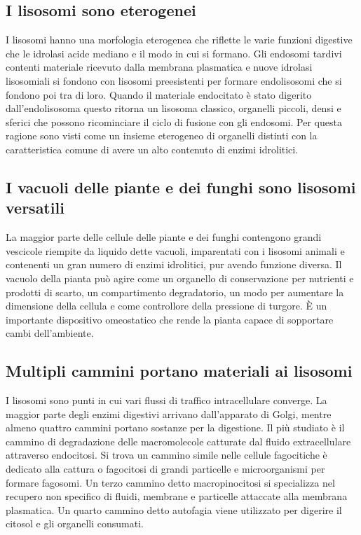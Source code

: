 \subsection{I lisosomi sono eterogenei}
I lisosomi hanno una morfologia eterogenea che riflette le varie funzioni digestive che le idrolasi acide mediano e il modo in cui si formano. Gli endosomi tardivi contenti materiale
ricevuto dalla membrana plasmatica e nuove idrolasi lisosomiali si fondono con lisosomi preesistenti per formare endolisosomi che si fondono poi tra di loro. Quando il materiale 
endocitato \`e stato digerito dall'endolisosoma questo ritorna un lisosoma classico, organelli piccoli, densi e sferici che possono ricominciare il ciclo di fusione con gli endosomi.
Per questa ragione sono visti come un insieme eterogeneo di organelli distinti con la caratteristica comune di avere un alto contenuto di enzimi idrolitici.
\subsection{I vacuoli delle piante e dei funghi sono lisosomi versatili}
La maggior parte delle cellule delle piante e dei funghi contengono grandi vescicole riempite da liquido dette vacuoli, imparentati con i lisosomi animali e contenenti un gran numero di
enzimi idrolitici, pur avendo funzione diversa. Il vacuolo della pianta pu\`o agire come un organello di conservazione per nutrienti e prodotti di scarto, un compartimento degradatorio,
un modo per aumentare la dimensione della cellula e come controllore della pressione di turgore. \`E un importante dispositivo omeostatico che rende la pianta capace di sopportare 
cambi dell'ambiente.
\subsection{Multipli cammini portano materiali ai lisosomi}
I lisosomi sono punti in cui vari flussi di traffico intracellulare converge. La maggior parte degli enzimi digestivi arrivano dall'apparato di Golgi, mentre almeno quattro cammini 
portano sostanze per la digestione. Il pi\`u studiato \`e il cammino di degradazione delle macromolecole catturate dal fluido extracellulare attraverso endocitosi. Si trova un
cammino simile nelle cellule fagocitiche \`e dedicato alla cattura  o fagocitosi di grandi particelle e microorganismi per formare fagosomi. Un terzo cammino detto macropinocitosi si
specializza nel recupero non specifico di fluidi, membrane e particelle attaccate alla membrana plasmatica. Un quarto cammino detto autofagia viene utilizzato per digerire il citosol
e gli organelli consumati. 
